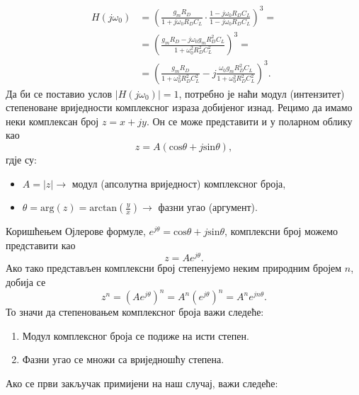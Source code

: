 \documentclass[master]{finthesis}
\begin{document}
\begin{equation} 
	\label{osc_feedback_eq_11}
	\displaystyle
	\begin{split}
		H(j\omega_{0}) &= \left(\frac{g_{m}R_{D}}{1+j\omega_{0}R_{D}C_{L}}\cdot\frac{1-j\omega_{0}R_{D}C_{L}}{1-j\omega_{0}R_{D}C_{L}}\right)^{3} = \\
			       &= \left(\frac{g_{m}R_{D}-j\omega_{0}g_{m}R_{D}^{2}C_{L}}{1+\omega_{0}^{2}R_{D}^{2}C_{L}^{2}}\right)^{3} = \\
			       &= \left(\frac{g_{m}R_{D}}{1+\omega_{0}^{2}R_{D}^{2}C_{L}^{2}}-j\frac{\omega_{0}g_{m}R_{D}^{2}C_{L}}{1+\omega_{0}^{2}R_{D}^{2}C_{L}^{2}}\right)^{3}.
	\end{split}
\end{equation}
Да би се поставио услов $|H(j\omega_{0})|=1$, потребно је наћи модул (интензитет) степеноване вриједности комплексног израза добијеног изнад. Рецимо да имамо неки комплексан број $z=x+jy$. Он се може представити и у поларном облику као
\begin{equation}
	\label{compl_1}
	z = A(\text{cos}\theta + j\text{sin}\theta),
\end{equation}
гдје су:
\begin{itemize}
	\item $A = |z| \rightarrow$ модул (апсолутна вриједност) комплексног броја,
	\item $\theta = \text{arg}(z) = \displaystyle \text{arctan}\left(\frac{y}{x}\right) \rightarrow$ фазни угао (аргумент).
\end{itemize}
Коришћењем Ојлерове формуле, $e^{j\theta} = \text{cos}\theta + j\text{sin}\theta$, комплексни број можемо представити као
\begin{equation}
	\label{compl_2}
	z = Ae^{j\theta}.
\end{equation}
Ако тако представљен комплексни број степенујемо неким природним бројем $n$, добија се
\begin{equation}
	\label{compl_3}
	z^{n} = \left(Ae^{j\theta}\right)^{n} = A^{n}\left(e^{j\theta}\right)^{n} = A^{n}e^{jn\theta}.
\end{equation}
То значи да степеновањем комплексног броја важи следеће:
\begin{enumerate}
	\item Модул комплексног броја се подиже на исти степен.
	\item Фазни угао се множи са вриједношћу степена.
\end{enumerate}
Ако се први закључак примијени на наш случај, важи следеће:
\end{document}
